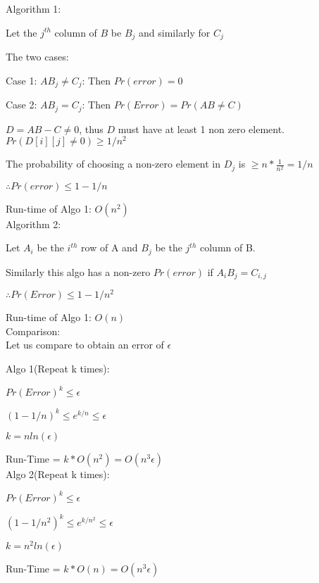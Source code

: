\documentclass[addpoints,12pt]{exam}
\begin{document}
\begin{questions}
\begin{solution}
            Algorithm 1:

            Let the $j^{th}$ column of $B$ be $B_j$ and similarly for $C_j$

            The two cases:
            
            Case 1: $AB_j \neq C_j$:
            Then $Pr(error) = 0$

            Case 2: $AB_j = C_j$:
            Then $Pr(Error) = Pr(AB \neq C)$

            $D = AB - C \neq 0$, thus $D$ must have at least 1 non zero element. $Pr(D[i][j] \neq 0) \geq 1/n^2$

            The probability of choosing a non-zero element in $D_j$ is $ \geq n*\frac{1}{n^2} = 1/n$

            $\therefore Pr(error) \leq 1 - 1/n$ 

            Run-time of Algo 1: $O(n^2)$
            \\
            
            Algorithm 2:

            Let $A_i$ be the $i^{th}$ row of A and $B_j$ be the $j^{th}$ column of B.

            Similarly this algo has a non-zero $Pr(error)$ if $A_iB_j = C_{i,j}$

            $\therefore Pr(Error) \leq 1 - 1/n^2$

            Run-time of Algo 1: $O(n)$
            \\

            Comparison:
            \\
            Let us compare to obtain an error of $\epsilon$

            Algo 1(Repeat k times):

            ${Pr(Error)}^k \leq \epsilon$

            $(1-1/n)^k \leq e^{k/n} \leq \epsilon$

            $k = nln(\epsilon)$

            Run-Time = $k*O(n^2) = O(n^3\epsilon)$
            \\

            Algo 2(Repeat k times):

            ${Pr(Error)}^k \leq \epsilon$

            $(1-1/n^2)^k \leq e^{k/n^2} \leq \epsilon$

            $k = n^2ln(\epsilon)$

            Run-Time = $k*O(n) = O(n^3\epsilon)$


\end{solution}
\end{questions}
\end{document}
